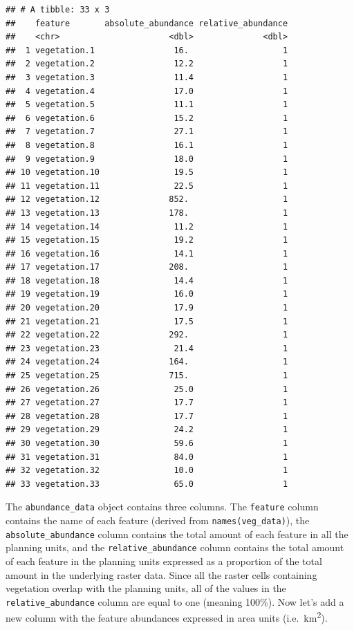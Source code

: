 \documentclass[12pt,]{book}
\begin{document}
\begin{verbatim}
## # A tibble: 33 x 3
##    feature       absolute_abundance relative_abundance
##    <chr>                      <dbl>              <dbl>
##  1 vegetation.1                16.                   1
##  2 vegetation.2                12.2                  1
##  3 vegetation.3                11.4                  1
##  4 vegetation.4                17.0                  1
##  5 vegetation.5                11.1                  1
##  6 vegetation.6                15.2                  1
##  7 vegetation.7                27.1                  1
##  8 vegetation.8                16.1                  1
##  9 vegetation.9                18.0                  1
## 10 vegetation.10               19.5                  1
## 11 vegetation.11               22.5                  1
## 12 vegetation.12              852.                   1
## 13 vegetation.13              178.                   1
## 14 vegetation.14               11.2                  1
## 15 vegetation.15               19.2                  1
## 16 vegetation.16               14.1                  1
## 17 vegetation.17              208.                   1
## 18 vegetation.18               14.4                  1
## 19 vegetation.19               16.0                  1
## 20 vegetation.20               17.9                  1
## 21 vegetation.21               17.5                  1
## 22 vegetation.22              292.                   1
## 23 vegetation.23               21.4                  1
## 24 vegetation.24              164.                   1
## 25 vegetation.25              715.                   1
## 26 vegetation.26               25.0                  1
## 27 vegetation.27               17.7                  1
## 28 vegetation.28               17.7                  1
## 29 vegetation.29               24.2                  1
## 30 vegetation.30               59.6                  1
## 31 vegetation.31               84.0                  1
## 32 vegetation.32               10.0                  1
## 33 vegetation.33               65.0                  1
\end{verbatim}

The \texttt{abundance\_data} object contains three columns. The
\texttt{feature} column contains the name of each feature (derived from
\texttt{names(veg\_data)}), the \texttt{absolute\_abundance} column
contains the total amount of each feature in all the planning units, and
the \texttt{relative\_abundance} column contains the total amount of
each feature in the planning units expressed as a proportion of the
total amount in the underlying raster data. Since all the raster cells
containing vegetation overlap with the planning units, all of the values
in the \texttt{relative\_abundance} column are equal to one (meaning
100\%). Now let's add a new column with the feature abundances expressed
in area units (i.e.~km\textsuperscript{2}).
\end{document}
